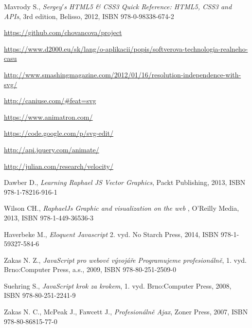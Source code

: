 \begin{thebibliography}{99}                               
	 \label{literatura}


 Mavrody S.,
 {\it Sergey$'$s HTML5 \& CSS3 Quick Reference: HTML5, CSS3 and APIs},
 3rd edition, Belisso, 2012, ISBN  978-0-98338-674-2

\url{https://github.com/chovancova/project} 

\url{https://www.d2000.eu/sk/lang/o-aplikacii/popis/softverova-technologia-realneho-casu}

 \url{http://www.smashingmagazine.com/2012/01/16/resolution-independence-with-svg/}

 \url{http://caniuse.com/#feat=svg}


  \url{https://www.animatron.com/}

 \url{https://code.google.com/p/svg-edit/}

 \url{http://api.jquery.com/animate/}

\url{http://julian.com/research/velocity/}

Dawber D.,
{\it Learning Raphael JS Vector Graphics}, 
 Packt Publishing, 2013, ISBN 978-1-78216-916-1
         
 
 
 Wilson CH., {\it RaphaelJs Graphic and visualization on the web} , 
O'Reilly Media, 2013, ISBN 978-1-449-36536-3
         

Haverbeke M., 
{\it Eloquent Javascript} 2. vyd. No Starch Press, 2014, ISBN 978-1-59327-584-6


Zakas N. Z., 
{\it JavaScript pro webové vývojáře Programujeme profesionálně},
 1. vyd. Brno:Computer Press, a.s., 2009,  ISBN 978-80-251-2509-0

Suehring S., 
{\it JavaScript krok za krokem},
1. vyd. Brno:Computer Press, 2008, ISBN 978-80-251-2241-9

Zakas N. C., McPeak J., Fawcett J.,
{\it Profesionálně Ajax},
Zoner Press, 2007,  ISBN 978-80-86815-77-0


\end{thebibliography}
